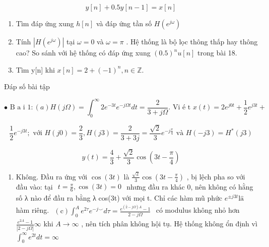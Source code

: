 \documentclass[
  10
]{article}
\providecommand{\tightlist}{%
  \setlength{\itemsep}{0pt}\setlength{\parskip}{0pt}}
\begin{document}
\[
y [ n ] + 0. 5 y [ n - 1 ] = x [ n ]
\]

\begin{enumerate}
\def\labelenumi{(\alph{enumi})}
\item
  Tìm đáp ứng xung \(h [ n ]\) và đáp ứng tần số
  \(H ( e ^ { j \omega } )\)
\item
  Tính \(| H ( e ^ { j \omega } ) |\) tại \(\omega = 0\) và
  \(\omega = \pi\) . Hệ thống là bộ lọc thông thấp hay thông cao? So
  sánh với hệ thống có đáp ứng xung \(( 0 . 5 ) ^ { n } u [ n ]\) trong
  bài 18.
\item
  Tìm y{[}n{]} khi
  \(x [ n ] = 2 + ( - 1 ) ^ { n } , n \in \mathbb { Z } .\)
\end{enumerate}

Đáp số bài tập

\[
\bullet \text {   B   a   i   } 1: (a) H (j \Omega) = \int_ {0} ^ {\infty} 2 e ^ {- 3 t} e ^ {- j \Omega t} d t = \frac {2}{3 + j \Omega}. \text {   Vi   é   t   } x (t) = 2 e ^ {j 0 t} + \frac {1}{2} e ^ {j 3 t} +
\]

\[
\frac {1}{2} e ^ {- j 3 t}; \text {   với   } H (j 0) = \frac {2}{3}, H (j 3) = \frac {2}{3 + 3 j} = \frac {\sqrt {2}}{3} e ^ {- j \frac {\pi}{4}} \text {   và   } H (- j 3) = H ^ {*} (j 3)
\]

\[
y (t) = \frac {4}{3} + \frac {\sqrt {2}}{3} \cos \left(3 t - \frac {\pi}{4}\right)
\]

\begin{enumerate}
\def\labelenumi{(\alph{enumi})}
\setcounter{enumi}{1}
\tightlist
\item
  Không. Đầu ra ứng với \(\cos ( 3 t )\) là
  \(\textstyle { \frac { \sqrt { 2 } } { 3 } } \cos ( 3 t - { \frac { \pi } { 4 } } )\)
  , bị lệch pha so với đầu vào: tại
  \(\begin{array} { r } { t = { \frac { \pi } { 6 } } , \cos ( 3 t ) = 0 } \end{array}\)
  nhưng đầu ra khác 0, nên không có hằng số λ nào để đầu ra bằng λ
  cos(3t) với mọi t. Chỉ các hàm mũ phức
  \(e ^ { \pm j 3 t } \mathrm { l } \mathrm { \hat { a } }\) hàm riêng.
  \(\begin{array} { r } { \mathrm { ( c ) } \int _ { 0 } ^ { A } e ^ { 2 \tau } e ^ { - j \smile } d \tau = \frac { e ^ { ( \bar { 2 } - j \Omega ) A } - 1 } { 2 - j \Omega } } \end{array}\)
  có modulus không nhỏ hơn
  \(\frac { e ^ { 2 A } - 1 } { | 2 - j \Omega | }  \infty\) khi
  \(A \to \infty\) , nên tích phân không hội tụ. Hệ thống không ổn định
  vì \(\textstyle \int _ { 0 } ^ { \infty } e ^ { 2 t } d t = \infty\)
\end{enumerate}
\end{document}
